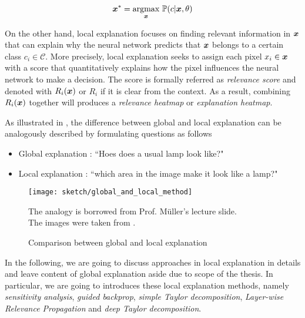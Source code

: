 \begin{align}
\patvector{x}^*  = \patarg{max}{\patvector{x}}  \mathbb{P}( c |\patvector{x},\theta)
\end{align}


On the other hand, local explanation focuses on finding relevant information in $\patvector{x}$ that can explain why the neural network predicts that $\boldsymbol{x}$ belongs to a certain class $c_i \in \mathcal{C}$.  More precisely, local explanation seeks to assign each pixel $x_i \in \patvector{x}$ with a score that quantitatively explains how the pixel influences the neural network to make a decision. The score is formally referred as \textit{relevance score} and denoted with $R_i(\boldsymbol{x})$ or $R_i$ if it is clear from the context. As a result, combining $R_i(\boldsymbol{x})$ together will produces a \textit{relevance heatmap} or \textit{explanation heatmap}.

As illustrated in \addfigure{\ref{fig:comparision_between_global_and_local_analysis}}, the difference between global and local explanation can be analogously described by formulating questions as follows
\begin{itemize}
	\item Global explanation : ``Hoes does a usual lamp look like?"
    \item Local explanation : ``which area in the image make it look like a lamp?" 
\end{itemize}

 \begin{figure}[!hbt]
\centering
\texttt{[image: sketch/global\_and\_local\_method]}
\caption{Comparison between global and local explanation}
\small{
The analogy is borrowed from Prof. M\"{u}ller's lecture slide. \\The images were taken from \cite{NguyenSynthesizingpreferredinputs2016a, BachPixelWiseExplanationsNonLinear2015}.
}
\label{fig:comparision_between_global_and_local_analysis}
\end{figure}

In the following, we are going to discuss approaches in local explanation in details and leave content of global explanation aside due to scope of the thesis. In particular, we are going to introduces these local explanation methods, namely \textit{sensitivity analysis}, \textit{guided backprop}, \textit{simple Taylor decomposition}, \textit{Layer-wise Relevance Propagation} and \textit{deep Taylor decomposition}.


